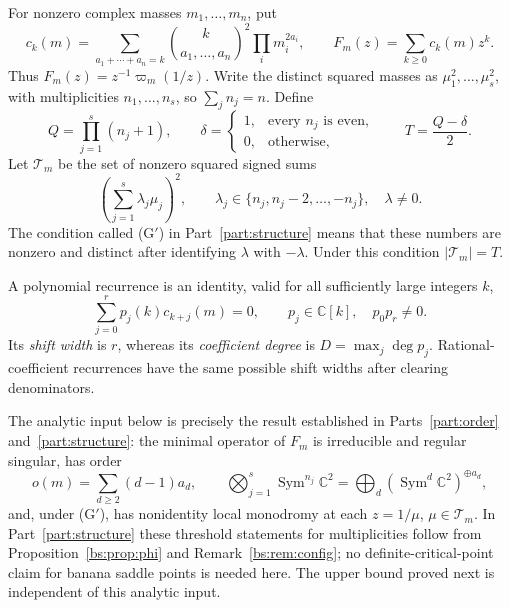 \documentclass[11pt,a4paper]{article}
\theoremstyle{definition}
\theoremstyle{remark}
\numberwithin{equation}{section}
\begin{document}
For nonzero complex masses $m_1,\ldots,m_n$, put
\[
 c_k(m)=\sum_{a_1+\cdots+a_n=k}
       \binom{k}{a_1,\ldots,a_n}^{\!2}\prod_i m_i^{2a_i},
 \qquad F_m(z)=\sum_{k\ge0}c_k(m)z^k.
\]
Thus $F_m(z)=z^{-1}\varpi_m(1/z)$.  Write the distinct squared
masses as $\mu_1^2,\ldots,\mu_s^2$, with multiplicities
$n_1,\ldots,n_s$, so $\sum_jn_j=n$.  Define
\begin{equation}
\label{tr:rt-tau}
 Q=\prod_{j=1}^s(n_j+1),\qquad
 \delta=\begin{cases}1,&\text{every }n_j\text{ is even},\\0,&\text{otherwise},\end{cases}
 \qquad T=\frac{Q-\delta}{2}.
\end{equation}
Let $\mathcal T_m$ be the set of nonzero squared signed sums
\[
 \left(\sum_{j=1}^s\lambda_j\mu_j\right)^2,
 \qquad \lambda_j\in\{n_j,n_j-2,\ldots,-n_j\},\quad \lambda\ne0.
\]
The condition called \textup{(G$'$)} in Part~\ref{part:structure} means that these
numbers are nonzero and distinct after identifying $\lambda$ with
$-\lambda$.  Under this condition $|\mathcal T_m|=T$.

A polynomial recurrence is an identity, valid for all sufficiently
large integers $k$,
\begin{equation}
\label{tr:rt-recurrence}
 \sum_{j=0}^r p_j(k)c_{k+j}(m)=0,
 \qquad p_j\in\mathbb C[k],\quad p_0p_r\ne0.
\end{equation}
Its \emph{shift width} is $r$, whereas its \emph{coefficient degree}
is $D=\max_j\deg p_j$.  Rational-coefficient recurrences have the
same possible shift widths after clearing denominators.

The analytic input below is precisely the result established in
Parts~\ref{part:order} and~\ref{part:structure}: the minimal operator of $F_m$ is irreducible and
regular singular, has order
\begin{equation}
\label{tr:rt-ode-order}
 o(m)=\sum_{d\ge2}(d-1)a_d,
 \qquad \bigotimes_{j=1}^s\operatorname{Sym}^{n_j}\mathbb C^2
           =\bigoplus_d(\operatorname{Sym}^d\mathbb C^2)^{\oplus a_d},
\end{equation}
and, under \textup{(G$'$)}, has nonidentity local monodromy at each
$z=1/\mu$, $\mu\in\mathcal T_m$.  In Part~\ref{part:structure} these threshold
statements for multiplicities follow from Proposition~\ref{bs:prop:phi}
and Remark~\ref{bs:rem:config}; no definite-critical-point claim for
banana saddle points is needed here.  The upper bound proved next
is independent of this analytic input.
\end{document}
